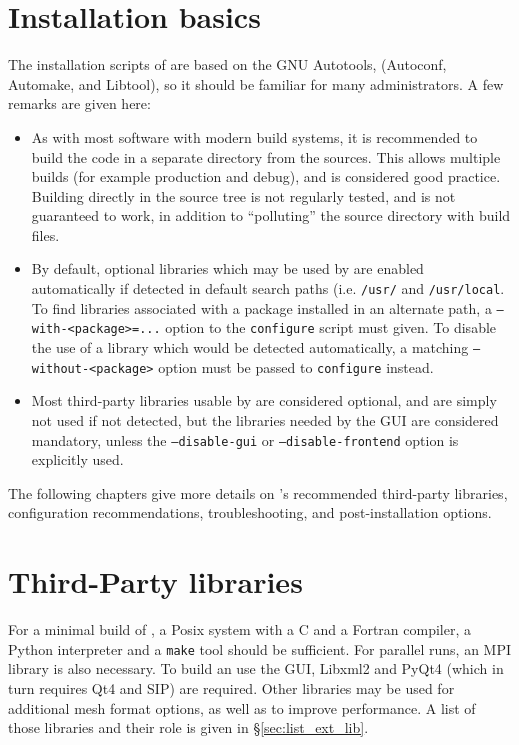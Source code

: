\documentclass[a4paper,10pt,twoside]{article}
\begin{document}
\section{Installation basics\label{sec:install_basics}}

The installation scripts of \CS are based on the GNU Autotools,
(Autoconf, Automake, and Libtool), so it should be familiar for many
administrators. A few remarks are given here:

\begin{itemize}
\item As with most software with modern build systems, it is recommended
      to build the code in a separate directory from the sources. This
      allows multiple builds (for example production and debug), and is
      considered good practice. Building directly in the source tree is
      not regularly tested, and is not guaranteed to work, in addition
      to ``polluting'' the source directory with build files.
\item By default, optional libraries which may be used by \CS are
      enabled automatically if detected in default search paths
      (i.e. \texttt{/usr/} and \texttt{/usr/local}. To find libraries
      associated with a package installed in an alternate path,
      a \texttt{--with-<package>=...} option to the \texttt{configure} script
      must given. To disable the use of a library which would be
      detected automatically, a matching \texttt{--without-<package>} option
      must be passed to \texttt{configure} instead.
\item Most third-party libraries usable by \CS are considered optional,
      and are simply not used if not detected, but the libraries needed by
      the GUI are considered mandatory, unless the \texttt{--disable-gui}
      or \texttt{--disable-frontend} option is explicitly used.
\end{itemize}

The following chapters give more details on \CS's recommended
third-party libraries, configuration recommendations, troubleshooting,
and post-installation options.

\section{Third-Party libraries\label{sec:ext_lib}}

For a minimal build of \CS, a Posix system with a C and a Fortran compiler,
a Python interpreter and a {\tt make} tool should be sufficient.
For parallel runs, an MPI library is also necessary.
To build an use the GUI, Libxml2 and PyQt4 (which in turn requires
Qt4 and SIP) are required.
Other libraries may be used for additional mesh format options,
as well as to improve performance. A list of those libraries
and their role is given in \S\ref{sec:list_ext_lib}.
\end{document}
